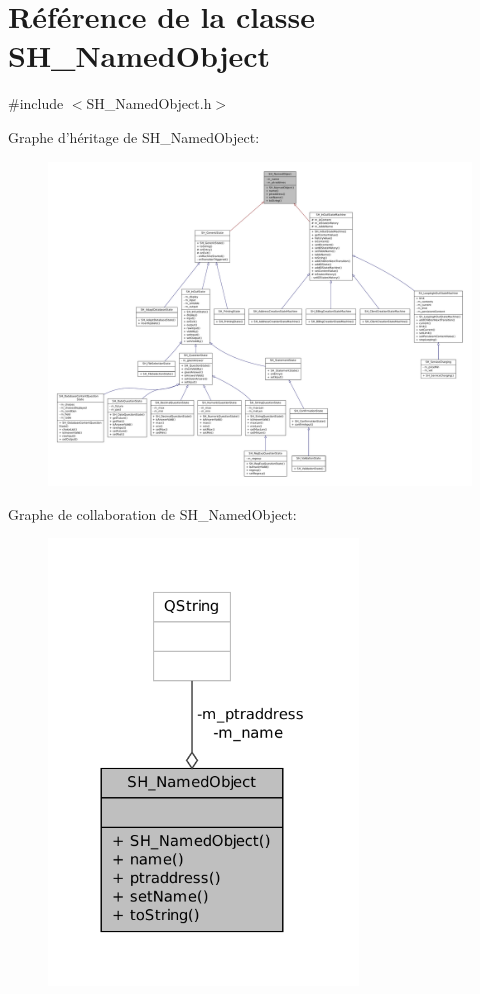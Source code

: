 \hypertarget{classSH__NamedObject}{\section{Référence de la classe S\-H\-\_\-\-Named\-Object}
\label{classSH__NamedObject}
}


{\ttfamily \#include $<$S\-H\-\_\-\-Named\-Object.\-h$>$}



Graphe d'héritage de S\-H\-\_\-\-Named\-Object\-:\nopagebreak
\begin{figure}[H]
\begin{center}
\leavevmode
\includegraphics[width=350pt]{classSH__NamedObject__inherit__graph}
\end{center}
\end{figure}


Graphe de collaboration de S\-H\-\_\-\-Named\-Object\-:\nopagebreak
\begin{figure}[H]
\begin{center}
\leavevmode
\includegraphics[width=233pt]{classSH__NamedObject__coll__graph}
\end{center}
\end{figure}
